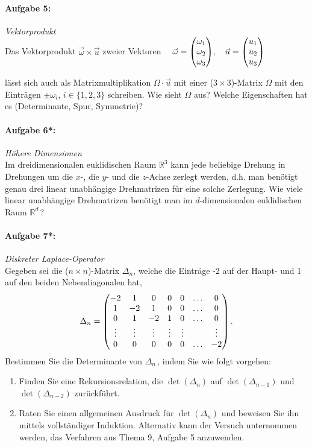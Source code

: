 \paragraph{Aufgabe 5: } \emph{Vektorprodukt}\\[0.2cm]
Das Vektorprodukt $\vec{\omega}\times \vec{u}$ zweier Vektoren
$\quad \vec{\omega}=\mqty(\omega_1\\\omega_2\\\omega_3),\quad\vec{u}=\mqty(u_1\\u_2\\u_3)$

lässt sich auch als Matrixmultiplikation $\Omega \cdot \vec{u}$ mit einer ($3\times 3$)-Matrix $\Omega$ mit den Einträgen $\pm \omega_i$, $i\in\{1,2,3\}$ schreiben. Wie sieht  $\Omega$ aus? Welche Eigenschaften hat es (Determinante, Spur, Symmetrie)?
%
%
\paragraph{Aufgabe 6*: } \emph{Höhere Dimensionen}\\[0.2cm]
Im dreidimensionalen euklidischen Raum $\mathbb{R}^3$ kann jede beliebige Drehung in Drehungen um die $x$-, die $y$- und die $z$-Achse zerlegt werden, d.h. man benötigt genau drei linear unabhängige Drehmatrizen für eine solche Zerlegung. Wie viele linear unabhängige Drehmatrizen benötigt man im $d$-dimensionalen euklidischen Raum $\mathbb{R}^d$\,?
%
%
\paragraph{Aufgabe 7*: } \emph{Diskreter Laplace-Operator}\\[0.2cm]
Gegeben sei die ($n\times n$)-Matrix $\Delta_n$, welche die Einträge -2 auf der Haupt- und 1 auf den beiden Nebendiagonalen hat,
\begin{align*}
\Delta_n=\mqty(
-2 & 1 & 0 & 0 & 0 &\dots & 0\\
1 & -2 & 1 & 0& 0 &\dots & 0\\
0 & 1 & -2 & 1 & 0 &\dots & 0\\
\vdots &\vdots &\vdots &\vdots &\vdots & &\vdots\\
0 & 0 & 0 & 0 & 0 &\dots & -2
)\,.
\end{align*}
Bestimmen Sie die Determinante von $\Delta_n$\,, indem Sie wie folgt vorgehen:
\begin{enumerate}
\item Finden Sie eine Rekursionsrelation, die $\det(\Delta_n)$ auf $\det(\Delta_{n-1})$ und $\det(\Delta_{n-2})$ zurückführt.
\item Raten Sie einen allgemeinen Ausdruck für $\det(\Delta_{n})$ und beweisen Sie ihn mittels vollständiger Induktion. Alternativ kann der Versuch unternommen werden, das Verfahren aus Thema 9, Aufgabe 5 anzuwenden.
\end{enumerate}